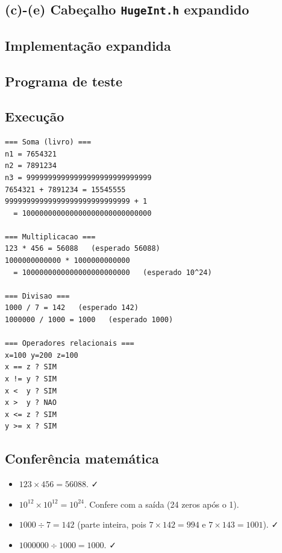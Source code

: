 \documentclass[11pt,a4paper]{article}
\begin{document}
\subsection*{(c)-(e) Cabe\c{c}alho \texttt{HugeInt.h} expandido}



\subsection*{Implementa\c{c}\~ao expandida}



\subsection*{Programa de teste}



\subsection*{Execu\c{c}\~ao}

\begin{saidabox}
\begin{lstlisting}[style=terminal]
=== Soma (livro) ===
n1 = 7654321
n2 = 7891234
n3 = 99999999999999999999999999999
7654321 + 7891234 = 15545555
99999999999999999999999999999 + 1
  = 100000000000000000000000000000

=== Multiplicacao ===
123 * 456 = 56088   (esperado 56088)
1000000000000 * 1000000000000
  = 1000000000000000000000000   (esperado 10^24)

=== Divisao ===
1000 / 7 = 142   (esperado 142)
1000000 / 1000 = 1000   (esperado 1000)

=== Operadores relacionais ===
x=100 y=200 z=100
x == z ? SIM
x != y ? SIM
x <  y ? SIM
x >  y ? NAO
x <= z ? SIM
y >= x ? SIM
\end{lstlisting}
\end{saidabox}

\subsection*{Confer\^encia matem\'atica}

\begin{itemize}[leftmargin=*,itemsep=0pt]
  \item $123 \times 456 = 56088$. ✓
  \item $10^{12} \times 10^{12} = 10^{24}$. Confere com a sa\'ida (24 zeros ap\'os o 1).
  \item $1000 \div 7 = 142$ (parte inteira, pois $7 \times 142 = 994$ e $7 \times 143 = 1001$). ✓
  \item $1000000 \div 1000 = 1000$. ✓
\end{itemize}
\end{document}
